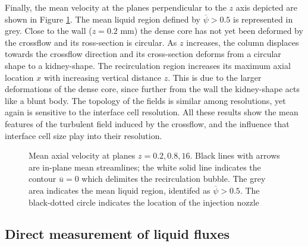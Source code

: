 Finally, the mean velocity at the planes perpendicular to the $z$ axis depicted are shown in Figure \ref{fig:JICF_turbulent_structures_planes_z}.  The mean liquid region defined by $\overline{\psi} > 0.5$ is represented in grey. Close to the wall ($z = 0.2$ mm) the dense core has not yet been deformed by the crossflow and its ross-section is circular. As $z$ increases, the column displaces towards the crossflow direction and its cross-section deforms from a circular shape to a kidney-shape. The recirculation region increases its maximum axial location $x$ with increasing vertical distance $z$. This is due to the larger deformations of the dense core, since further from the wall the kidney-shape acts like a blunt body. The topology of the fields is similar among resolutions, yet again is sensitive to the interface cell resolution. All these results show the mean features of the turbulent field induced by the crossflow, and the influence that  interface cell size play into their resolution. 




\clearpage



\begin{figure}[ht]
\centering
\caption[Mean axial velocity at planes $z = 0.2, 0.8, 16$ mm]{Mean axial velocity at planes $z = 0.2, 0.8, 16$. Black lines with arrows are in-plane mean streamlines; the white solid line indicates the contour $\overline{u} = 0$ which delimites the recirculation bubble. The grey area  indicates the mean liquid region, identifed as $\overline{\psi} > 0.5$. The black-dotted circle indicates the location of the injection nozzle}
\label{fig:JICF_turbulent_structures_planes_z}
\end{figure}




\subsection{Direct measurement of liquid fluxes}
\label{subsec:ch5_direct_measurement_fluxes_IB}

